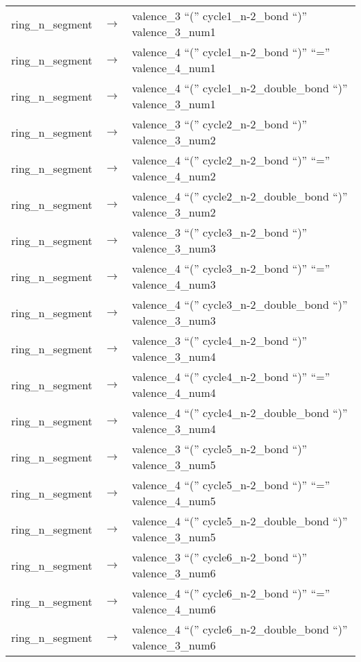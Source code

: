 \documentclass[../Document.tex]{subfiles}
\begin{document}
\begin{longtable}{m{} p{} p{}}
    ring\_n\_segment & $\rightarrow$ & valence\_3 ``('' cycle1\_n-2\_bond ``)'' valence\_3\_num1 \\
    ring\_n\_segment & $\rightarrow$ & valence\_4 ``('' cycle1\_n-2\_bond ``)'' ``='' valence\_4\_num1 \\
    ring\_n\_segment & $\rightarrow$ & valence\_4 ``('' cycle1\_n-2\_double\_bond ``)'' valence\_3\_num1 \\
    ring\_n\_segment & $\rightarrow$ & valence\_3 ``('' cycle2\_n-2\_bond ``)'' valence\_3\_num2 \\
    ring\_n\_segment & $\rightarrow$ & valence\_4 ``('' cycle2\_n-2\_bond ``)'' ``='' valence\_4\_num2 \\
    ring\_n\_segment & $\rightarrow$ & valence\_4 ``('' cycle2\_n-2\_double\_bond ``)'' valence\_3\_num2 \\
    ring\_n\_segment & $\rightarrow$ & valence\_3 ``('' cycle3\_n-2\_bond ``)'' valence\_3\_num3 \\
    ring\_n\_segment & $\rightarrow$ & valence\_4 ``('' cycle3\_n-2\_bond ``)'' ``='' valence\_4\_num3 \\
    ring\_n\_segment & $\rightarrow$ & valence\_4 ``('' cycle3\_n-2\_double\_bond ``)'' valence\_3\_num3 \\
    ring\_n\_segment & $\rightarrow$ & valence\_3 ``('' cycle4\_n-2\_bond ``)'' valence\_3\_num4 \\
    ring\_n\_segment & $\rightarrow$ & valence\_4 ``('' cycle4\_n-2\_bond ``)'' ``='' valence\_4\_num4 \\
    ring\_n\_segment & $\rightarrow$ & valence\_4 ``('' cycle4\_n-2\_double\_bond ``)'' valence\_3\_num4 \\
    ring\_n\_segment & $\rightarrow$ & valence\_3 ``('' cycle5\_n-2\_bond ``)'' valence\_3\_num5 \\
    ring\_n\_segment & $\rightarrow$ & valence\_4 ``('' cycle5\_n-2\_bond ``)'' ``='' valence\_4\_num5 \\
    ring\_n\_segment & $\rightarrow$ & valence\_4 ``('' cycle5\_n-2\_double\_bond ``)'' valence\_3\_num5 \\
    ring\_n\_segment & $\rightarrow$ & valence\_3 ``('' cycle6\_n-2\_bond ``)'' valence\_3\_num6 \\
    ring\_n\_segment & $\rightarrow$ & valence\_4 ``('' cycle6\_n-2\_bond ``)'' ``='' valence\_4\_num6 \\
    ring\_n\_segment & $\rightarrow$ & valence\_4 ``('' cycle6\_n-2\_double\_bond ``)'' valence\_3\_num6 \\

\end{longtable}
\end{document}

